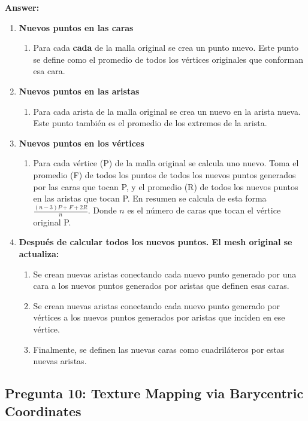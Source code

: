 \documentclass{article}
\begin{document}
\textbf{Answer:} 

\begin{enumerate}
    \item \textbf{Nuevos puntos en las caras}
    \begin{enumerate}
        \item Para cada \textbf{cada} de la malla original se crea un punto nuevo. Este punto se define como el promedio de todos los vértices originales que conforman esa cara.
    \end{enumerate}
    \item \textbf{Nuevos puntos en las aristas}
    \begin{enumerate}
        \item Para cada arista de la malla original se crea un nuevo en la arista nueva. Este punto también es el promedio de los extremos de la arista.
    \end{enumerate}
    \item \textbf{Nuevos puntos en los vértices}
    \begin{enumerate}
        \item Para cada vértice (P) de la malla original se calcula uno nuevo. Toma el promedio (F) de todos los puntos de todos los nuevos puntos generados por las caras que tocan P, y el promedio (R) de todos los nuevos puntos en las aristas que tocan P. En resumen se calcula de esta forma $\frac{(n-3)P+F+2R}{n}$. Donde $n$ es el número de caras que tocan el vértice original P.
    \end{enumerate}
    \item \textbf{Después de calcular todos los nuevos puntos. El mesh original se actualiza:}
    \begin{enumerate}
        \item Se crean nuevas aristas conectando cada nuevo punto generado por una cara a los nuevos puntos generados por aristas que definen esas caras.
        \item Se crean nuevas aristas conectando cada nuevo punto generado por vértices a los nuevos puntos generados por aristas que inciden en ese vértice.
        \item Finalmente, se definen las nuevas caras como cuadriláteros por estas nuevas aristas.
    \end{enumerate}
\end{enumerate}

\subsection{Pregunta 10: Texture Mapping via Barycentric Coordinates}
\end{document}
